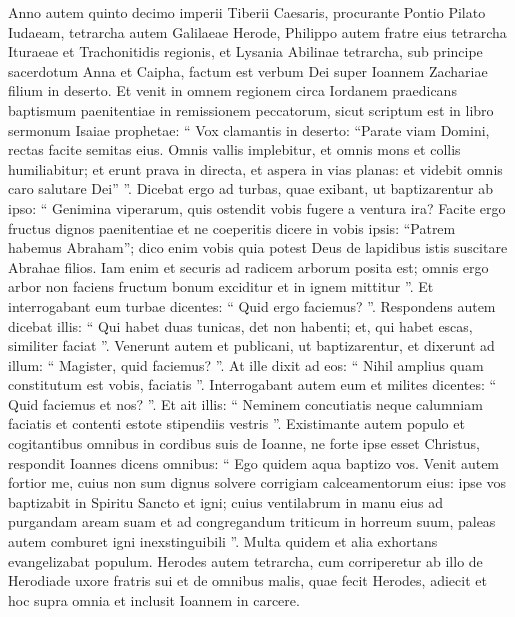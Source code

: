 \begin{biblechapter}
\begin{biblechapter}
\begin{biblechapter}
\verse Anno autem quinto decimo imperii Tiberii Caesaris, procurante Pontio Pilato Iudaeam, tetrarcha autem Galilaeae Herode, Philippo autem fratre eius tetrarcha Ituraeae et Trachonitidis regionis, et Lysania Abilinae tetrarcha, 
 \verse sub principe sacerdotum Anna et Caipha, factum est verbum Dei super Ioannem Zachariae filium in deserto. 
\verse Et venit in omnem regionem circa Iordanem praedicans baptismum paenitentiae in remissionem peccatorum, 
\verse sicut scriptum est in libro sermonum Isaiae prophetae:
 “ Vox clamantis in deserto:
 “Parate viam Domini,
 rectas facite semitas eius.
 \verse Omnis vallis implebitur,
 et omnis mons et collis humiliabitur;
 et erunt prava in directa,
 et aspera in vias planas:
 \verse et videbit omnis caro salutare Dei” ”.
 \verse Dicebat ergo ad turbas, quae exibant, ut baptizarentur ab ipso: “ Genimina viperarum, quis ostendit vobis fugere a ventura ira? 
\verse Facite ergo fructus dignos paenitentiae et ne coeperitis dicere in vobis ipsis: “Patrem habemus Abraham”; dico enim vobis quia potest Deus de lapidibus istis suscitare Abrahae filios. 
\verse Iam enim et securis ad radicem arborum posita est; omnis ergo arbor non faciens fructum bonum exciditur et in ignem mittitur ”.
 \verse Et interrogabant eum turbae dicentes: “ Quid ergo faciemus? ”. 
\verse Respondens autem dicebat illis: “ Qui habet duas tunicas, det non habenti; et, qui habet escas, similiter faciat ”. 
\verse Venerunt autem et publicani, ut baptizarentur, et dixerunt ad illum: “ Magister, quid faciemus? ”. 
\verse At ille dixit ad eos: “ Nihil amplius quam constitutum est vobis, faciatis ”. 
\verse Interrogabant autem eum et milites dicentes: “ Quid faciemus et nos? ”. Et ait illis: “ Neminem concutiatis neque calumniam faciatis et contenti estote stipendiis vestris ”.
 \verse Existimante autem populo et cogitantibus omnibus in cordibus suis de Ioanne, ne forte ipse esset Christus, 
\verse respondit Ioannes dicens omnibus: “ Ego quidem aqua baptizo vos. Venit autem fortior me, cuius non sum dignus solvere corrigiam calceamentorum eius: ipse vos baptizabit in Spiritu Sancto et igni; 
 \verse cuius ventilabrum in manu eius ad purgandam aream suam et ad congregandum triticum in horreum suum, paleas autem comburet igni inexstinguibili ”.
 \verse Multa quidem et alia exhortans evangelizabat populum. 
\verse Herodes autem tetrarcha, cum corriperetur ab illo de Herodiade uxore fratris sui et de omnibus malis, quae fecit Herodes, 
\verse adiecit et hoc supra omnia et inclusit Ioannem in carcere.

\end{biblechapter}
\end{biblechapter}
\end{biblechapter}
